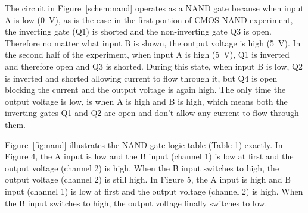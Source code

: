 The circuit in Figure~\ref{schem:nand} operates as a NAND gate because when input A is low (\SI{0}{V}), as is the case in the first portion of CMOS NAND experiment, the inverting gate (Q1) is shorted and the non-inverting gate Q3 is open. Therefore no matter what input B is shown, the output voltage is high (\SI{5}{V}).  In the second half of the experiment, when input A is high (\SI{5}{V}), Q1 is inverted and therefore open and Q3 is shorted. During this state, when input B is low, Q2 is inverted and shorted allowing current to flow through it, but Q4 is open blocking the current and the output voltage is again high. The only time the output voltage is low, is when A is high and B is high, which means both the inverting gates Q1 and Q2 are open and don't allow any current to flow through them.

Figure~\ref{fig:nand} illustrates the NAND gate logic table (Table 1) exactly. In Figure 4, the A input is low and the B input (channel 1) is low at first and the output voltage (channel 2) is high. When the B input switches to high, the output voltage (channel 2) is still high. In Figure 5, the A input is high and B input (channel 1) is low at first and the output voltage (channel 2) is high. When the B input switches to high, the output voltage finally switches to low.




